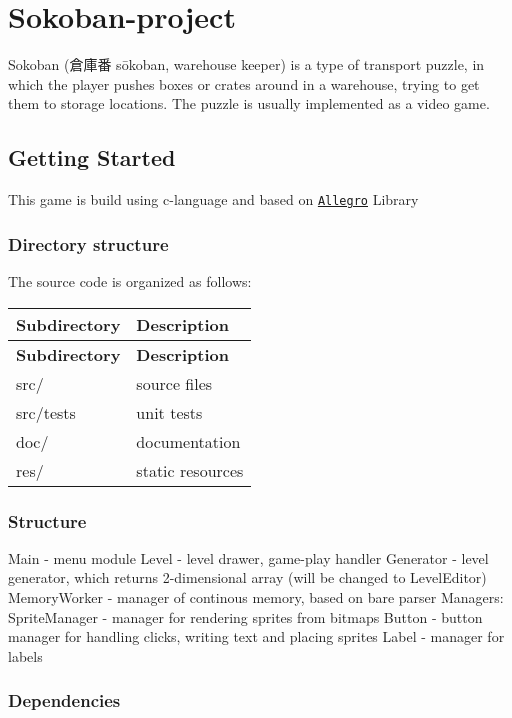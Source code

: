 \section*{Sokoban-\/project}

Sokoban (倉庫番 sōkoban, warehouse keeper) is a type of transport puzzle, in which the player pushes boxes or crates around in a warehouse, trying to get them to storage locations. The puzzle is usually implemented as a video game.

\subsection*{Getting Started}

This game is build using c-\/language and based on \href{http://liballeg.org/}{\tt Allegro} Library \subsubsection*{Directory structure}

The source code is organized as follows\+:

\tabulinesep=1mm
\begin{longtabu} spread 0pt [c]{*{2}{|X[-1]}|}
\hline
\rowcolor{\tableheadbgcolor}\textbf{ Subdirectory }&\textbf{ Description  }\\
\endfirsthead
\hline
\endfoot
\hline
\rowcolor{\tableheadbgcolor}\textbf{ Subdirectory }&\textbf{ Description  }\\
\endhead
src/ &source files \\
src/tests &unit tests \\
doc/ &documentation \\
res/     &static resources \\
\end{longtabu}
\subsubsection*{Structure}

Main -\/ menu module Level -\/ level drawer, game-\/play handler Generator -\/ level generator, which returns 2-\/dimensional array (will be changed to Level\+Editor) Memory\+Worker -\/ manager of continous memory, based on bare parser Managers\+: Sprite\+Manager -\/ manager for rendering sprites from bitmaps Button -\/ button manager for handling clicks, writing text and placing sprites Label -\/ manager for labels \subsubsection*{Dependencies}

